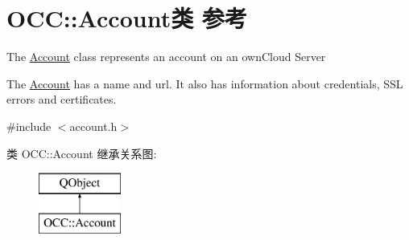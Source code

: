 \hypertarget{class_o_c_c_1_1_account}{}\section{O\+CC\+:\+:Account类 参考}
\label{class_o_c_c_1_1_account}


The \hyperlink{class_o_c_c_1_1_account}{Account} class represents an account on an own\+Cloud Server

The \hyperlink{class_o_c_c_1_1_account}{Account} has a name and url. It also has information about credentials, S\+SL errors and certificates.  




{\ttfamily \#include $<$account.\+h$>$}

类 O\+CC\+:\+:Account 继承关系图\+:\begin{figure}[H]
\begin{center}
\leavevmode
\includegraphics[height=2.000000cm]{class_o_c_c_1_1_account}
\end{center}
\end{figure}
